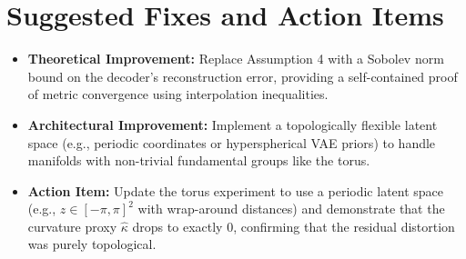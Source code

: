 \documentclass{article}
\begin{document}
\section{Suggested Fixes and Action Items}
\begin{itemize}
    \item \textbf{Theoretical Improvement:} Replace Assumption 4 with a Sobolev norm bound on the decoder's reconstruction error, providing a self-contained proof of metric convergence using interpolation inequalities.
    \item \textbf{Architectural Improvement:} Implement a topologically flexible latent space (e.g., periodic coordinates or hyperspherical VAE priors) to handle manifolds with non-trivial fundamental groups like the torus.
    \item \textbf{Action Item:} Update the torus experiment to use a periodic latent space (e.g., $z \in [-\pi, \pi]^2$ with wrap-around distances) and demonstrate that the curvature proxy $\hat{\kappa}$ drops to exactly 0, confirming that the residual distortion was purely topological.
\end{itemize}
\end{document}
